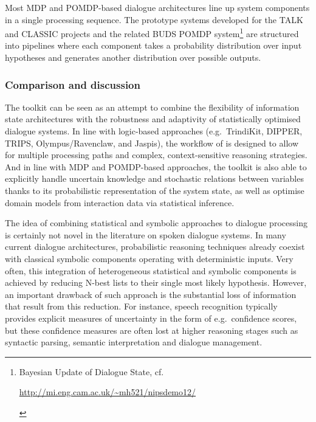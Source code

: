Most MDP and POMDP-based dialogue architectures line up system components in a single processing sequence. The prototype systems developed for the TALK and CLASSIC projects \citep{Henderson:2008,Lemon:2012} and the related BUDS POMDP system\footnote{Bayesian Update of Dialogue State, cf. \begin{scriptsize}\url{http://mi.eng.cam.ac.uk/~mh521/nipsdemo12/}\end{scriptsize}} are structured into pipelines where each component takes a probability distribution over input hypotheses and generates another distribution over possible outputs.  



\subsubsection*{Comparison and discussion}

The \opendial{} toolkit can be seen as an attempt to combine the flexibility of information state architectures with the robustness and adaptivity of statistically optimised dialogue systems.  In line with logic-based approaches (e.g.\ TrindiKit, DIPPER, TRIPS, Olympus/Ravenclaw, and Jaspis), the workflow of \opendial{} is designed to allow for multiple processing paths and complex, context-sensitive reasoning strategies.  And in line with MDP and POMDP-based approaches, the toolkit is also able to explicitly handle uncertain knowledge and stochastic relations between variables thanks to its probabilistic representation of the system state, as well as optimise domain models from interaction data via statistical inference.  

The idea of combining statistical and symbolic approaches to dialogue processing is certainly not novel in the literature on spoken dialogue systems.  In many current dialogue architectures, probabilistic reasoning techniques already coexist with classical symbolic components operating with deterministic inputs. Very often, this integration of heterogeneous statistical and symbolic components is achieved by reducing N-best lists to their single most likely hypothesis. However, an important drawback of such approach is the substantial loss of information that result from this reduction. For instance, speech recognition typically provides explicit measures of uncertainty in the form of e.g.\ confidence scores, but these confidence measures are often lost at higher reasoning stages such as syntactic parsing, semantic interpretation and dialogue management. 


